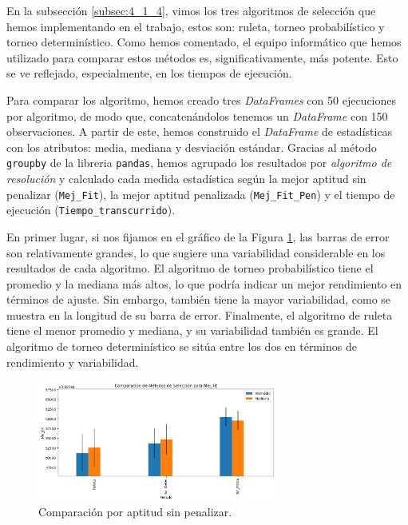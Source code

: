 \documentclass[12pt,a4paper]{book}
\begin{document}
En la subsección \ref{subsec:4_1_4}, vimos los tres algoritmos de selección que hemos implementando en el trabajo, estos son: ruleta, torneo probabilístico y torneo determinístico. Como hemos comentado, el equipo informático que hemos utilizado para comparar estos métodos es, significativamente, más potente. Esto se ve reflejado, especialmente, en los tiempos de ejecución.  

Para comparar los algoritmo, hemos creado tres \textsl{DataFrames} con 50 ejecuciones por algoritmo, de modo que, concatenándolos tenemos un \textsl{DataFrame} con 150 observaciones. A partir de este, hemos construido el \textsl{DataFrame} de estadísticas con los atributos: media, mediana y desviación estándar. Gracias al método \texttt{groupby} de la libreria \texttt{pandas}, hemos agrupado los resultados por \textsl{algoritmo de resolución} y calculado cada medida estadística según la mejor aptitud sin penalizar (\texttt{Mej\_Fit}), la mejor aptitud penalizada (\texttt{Mej\_Fit\_Pen}) y el tiempo de ejecución (\texttt{Tiempo\_transcurrido}). 

En primer lugar, si nos fijamos en el gráfico de la Figura \ref{fig:comparar_metodos_1}, las barras de error son relativamente grandes, lo que sugiere una variabilidad considerable en los resultados de cada algoritmo.
El algoritmo de torneo probabilístico tiene el promedio y la mediana más altos, lo que podría indicar un mejor rendimiento en términos de ajuste. Sin embargo, también tiene la mayor variabilidad, como se muestra en la longitud de su barra de error. Finalmente, el algoritmo de ruleta tiene el menor promedio y mediana, y su variabilidad también es grande. El algoritmo de torneo determinístico se sitúa entre los dos en términos de rendimiento y variabilidad.

\begin{figure}[h] 
    	\begin{center}
    	\includegraphics[width=0.7\textwidth]{img/compara_metodos_1.png}
    	\end{center}
    	\caption{Comparación por aptitud sin penalizar.}
    	\label{fig:comparar_metodos_1}
	\end{figure}
\end{document}

